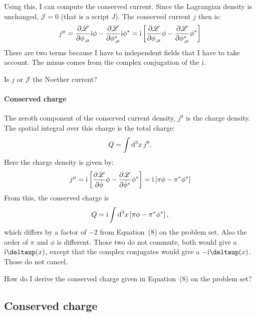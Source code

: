 \documentclass[11pt, english, fleqn, DIV=15, headinclude, BCOR=1cm]{scrartcl}
\begin{document}
Using this, I can compute the conserved current. Since the Lagrangian density
is unchanged, $\mathscr J = 0$ (that is a script $J$). The conserved current
$j$ then is:
\begin{equation}
    j^\mu =
    \frac{\partial {\mathscr L}}{\partial {\phi_{,\mu}}} \mathrm i \phi
    - \frac{\partial {\mathscr L}}{\partial {\phi_{,\mu}^*}} \mathrm i \phi^*
    = \mathrm i
    \left[ 
        \frac{\partial {\mathscr L}}{\partial {\phi_{,\mu}}} \phi
        - \frac{\partial {\mathscr L}}{\partial {\phi_{,\mu}^*}} \phi^*
     \right]
\end{equation}
There are two terms because I have to independent fields that I have to take
account. The minus comes from the complex conjugation of the $\mathrm i$.

\needspace{5cm}
\begin{question}
    Is $j$ or $\mathcal J$ the Noether current?
\end{question}

\paragraph{Conserved charge}

The zeroth component of the conserved current density, $j^0$ is the charge
density. The spatial integral over this charge is the total charge:
\begin{equation}
    Q = \int \mathop{}\!\mathrm d^3 x \, j^0.
\end{equation}
Here the charge density is given by:
\begin{equation}
    j^\mu
    = \mathrm i
    \left[ 
        \frac{\partial {\mathscr L}}{\partial {\dot\phi}} \phi
        - \frac{\partial {\mathscr L}}{\partial {\dot\phi^*}} \phi^*
     \right]
    = \mathrm i \left[  \pi \phi - \pi^* \phi^*  \right]
\end{equation}
From this, the conserved charge is
\begin{equation}
    \label{eq:mein-Q}
    Q = \mathrm i \int \mathop{}\!\mathrm d^3 x \left[  \pi \phi - \pi^* \phi^*  \right],
\end{equation}
which differs by a factor of $-2$ from Equation~(8) on the problem set. Also
the order of $\pi$ and $\phi$ is different. Those two do not commute, both
would give a $\iup\deltaup(x)$, except that the complex conjugates would give
a $-\iup\deltaup(x)$. Those do not cancel.

\needspace{5cm}
\begin{question}
    How do I derive the conserved charge given in Equation~(8) on the problem
    set?
\end{question}

\subsection{Conserved charge}
\end{document}
